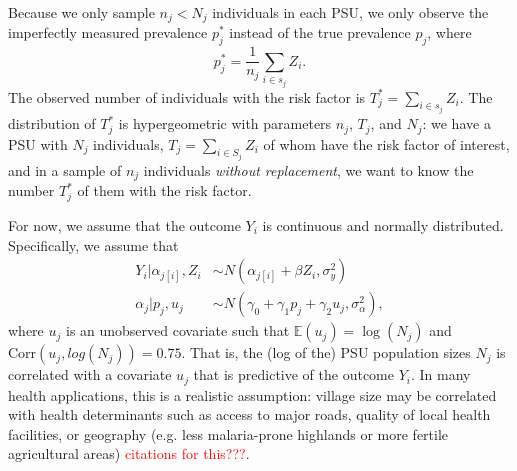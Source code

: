 \documentclass[10pt,a4paper]{article}
\newcommand*{\red}{\textcolor{red}}
\begin{document}



Because we only sample $n_j < N_j$ individuals in each PSU, we only observe the imperfectly measured prevalence $p^*_j$ instead of the true prevalence $p_j$, where
\[
	p^*_j = \frac{1}{n_j} \sum_{i \in s_j} Z_i.
\]
The observed number of individuals with the risk factor is $T^*_j = \sum_{i \in s_j} Z_i$. The distribution of $T^*_j$ is hypergeometric with parameters $n_j$, $T_j$, and $N_j$: we have a PSU with $N_j$ individuals, $T_j = \sum_{i \in S_j} Z_i$ of whom have the risk factor of interest, and in a sample of $n_j$ individuals \textit{without replacement}, we want to know the number $T^*_j$ of them with the risk factor.

For now, we assume that the outcome $Y_i$ is continuous and normally distributed. Specifically, we assume that
\begin{align*}
	Y_i | \alpha_{j[i]}, Z_i &\sim N(\alpha_{j[i]} + \beta Z_i, \sigma_y^2) \\
	\alpha_j | p_j, u_j &\sim N(\gamma_0 + \gamma_1 p_j + \gamma_2 u_j, \sigma_{\alpha}^2),
\end{align*}
where $u_j$ is an unobserved covariate such that $\mathbb{E}(u_j) = \log(N_j)$ and $\mathrm{Corr}(u_j, log(N_j)) = 0.75$. That is, the (log of the) PSU population sizes $N_j$ is correlated with a covariate $u_j$ that is predictive of the outcome $Y_i$. In many health applications, this is a realistic assumption: village size may be correlated with health determinants such as access to major roads, quality of local health facilities, or geography (e.g. less malaria-prone highlands or more fertile agricultural areas)  \red{citations for this???}.
\end{document}
